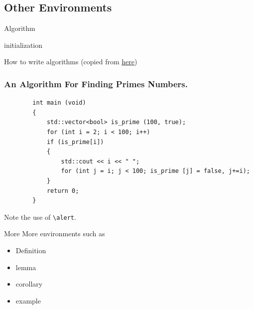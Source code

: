 \subsection{Other Environments}

\begin{frame}{Algorithm}
    \scriptsize
    \begin{algorithm}[H]
        initialization\;
        \caption{How to write algorithms
        (copied from \href{https://en.wikibooks.org/wiki/LaTeX/Algorithms}{here})}
        \end{algorithm}
\end{frame}

\begin{frame}[fragile]
    \frametitle{An Algorithm For Finding Primes Numbers.}
    \scriptsize
    \begin{verbatim}
        int main (void)
        {
            std::vector<bool> is_prime (100, true);
            for (int i = 2; i < 100; i++)
            if (is_prime[i])
            {
                std::cout << i << " ";
                for (int j = i; j < 100; is_prime [j] = false, j+=i);
            }
            return 0;
        }
    \end{verbatim}

    \vspace{-0.7cm}

    \begin{uncoverenv}
    Note the use of \verb|\alert|.
    \end{uncoverenv}
\end{frame}

\begin{frame}{More}
    More environments such as

    \begin{itemize}
        \item Definition
        \item lemma
        \item corollary
        \item example
    \end{itemize}
\end{frame}

